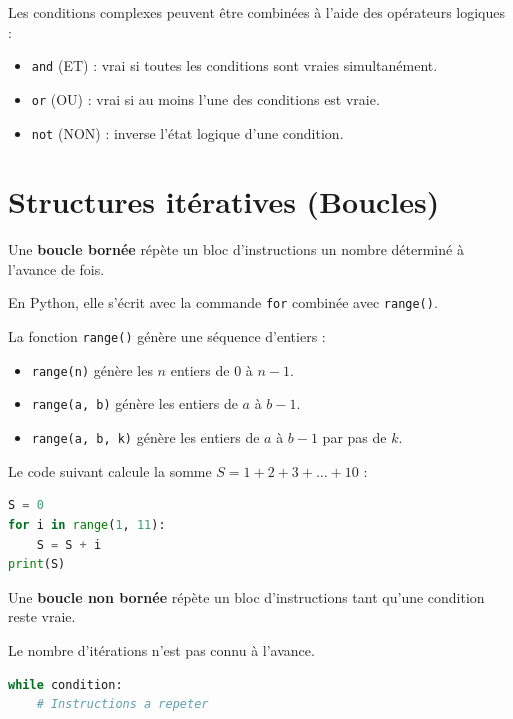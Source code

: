 \begin{remarque}
	Les conditions complexes peuvent être combinées à l'aide des opérateurs logiques :
	\begin{itemize}
		\item \lstinline|and| (ET) : vrai si toutes les conditions sont vraies simultanément.
		\item \lstinline|or| (OU) : vrai si au moins l'une des conditions est vraie.
		\item \lstinline|not| (NON) : inverse l'état logique d'une condition.
	\end{itemize}
\end{remarque}


\section{Structures itératives (Boucles)}

\begin{defin}
	Une \textbf{boucle bornée} répète un bloc d'instructions un nombre déterminé à l'avance de fois.

	En Python, elle s'écrit avec la commande \lstinline|for| combinée avec \lstinline|range()|.
\end{defin}

\begin{prop}
	La fonction \lstinline|range()| génère une séquence d'entiers :
	\begin{itemize}
		\item \lstinline|range(n)| génère les $n$ entiers de $0$ à $n-1$.
		\item \lstinline|range(a, b)| génère les entiers de $a$ à $b-1$.
		\item \lstinline|range(a, b, k)| génère les entiers de $a$ à $b-1$ par pas de $k$.
	\end{itemize}
\end{prop}

\begin{ex}
	Le code suivant calcule la somme $S = 1 + 2 + 3 + \dots + 10$ :
	\begin{lstlisting}[language=Python]
S = 0
for i in range(1, 11):
    S = S + i
print(S)
\end{lstlisting}
\end{ex}

\begin{defin}
	Une \textbf{boucle non bornée} répète un bloc d'instructions tant qu'une condition reste vraie.

	Le nombre d'itérations n'est pas connu à l'avance.
	\begin{lstlisting}[language=Python]
while condition:
    # Instructions a repeter
\end{lstlisting}
\end{defin}


